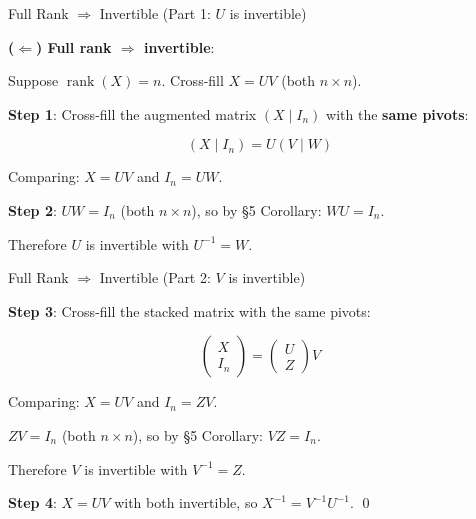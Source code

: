\documentclass[10pt]{beamer}
\theoremstyle{definition}
\newcommand{\x}[1]{\alert{\textbf{#1}}}
\begin{document}
\begin{frame}{Full Rank $\Rightarrow$ Invertible (Part 1: $U$ is invertible)}

\x{($\Leftarrow$) Full rank $\Rightarrow$ invertible}:

Suppose $\operatorname{rank}(X) = n$. Cross-fill $X = UV$ (both $n \times n$).

\vspace{0.5em}

\x{Step 1}: Cross-fill the augmented matrix $(X \mid I_n)$ with the \x{same pivots}:

$$(X \mid I_n) = U(V \mid W)$$

Comparing: $X = UV$ and $I_n = UW$.

\vspace{0.5em}

\x{Step 2}: $UW = I_n$ (both $n \times n$), so by \S5 Corollary: $WU = I_n$.

Therefore $U$ is invertible with $U^{-1} = W$.

\end{frame}

\begin{frame}{Full Rank $\Rightarrow$ Invertible (Part 2: $V$ is invertible)}

\x{Step 3}: Cross-fill the stacked matrix with the same pivots:

$$\begin{pmatrix} X \\ I_n \end{pmatrix} = \begin{pmatrix} U \\ Z \end{pmatrix} V$$

Comparing: $X = UV$ and $I_n = ZV$.

\vspace{0.5em}

$ZV = I_n$ (both $n \times n$), so by \S5 Corollary: $VZ = I_n$.

Therefore $V$ is invertible with $V^{-1} = Z$.

\vspace{0.5em}

\x{Step 4}: $X = UV$ with both invertible, so $X^{-1} = V^{-1}U^{-1}$. \qed

\end{frame}
\end{document}
